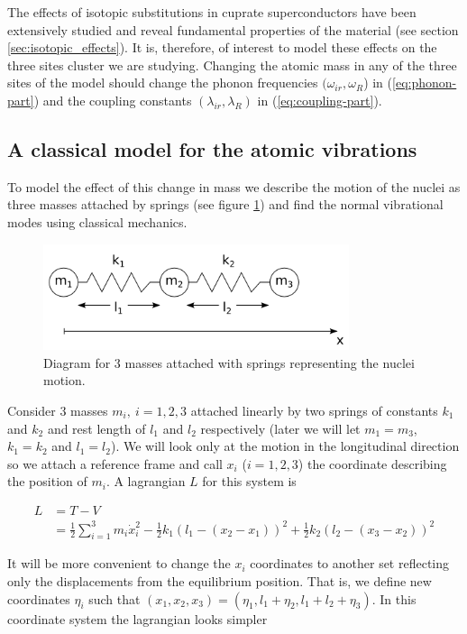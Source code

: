 The effects of isotopic substitutions in cuprate superconductors have been extensively studied and reveal fundamental properties of the material (see section \ref{sec:isotopic_effects}). 
It is, therefore, of interest to model these effects on the three sites cluster we are studying.
Changing the atomic mass in any of the three sites of the model should change the phonon frequencies $(\omega_{ir},\omega_R$) in (\ref{eq:phonon-part}) and the coupling constants $(\lambda_{ir},\lambda_R)$ in (\ref{eq:coupling-part}).

\subsection{A classical model for the atomic vibrations}

To model the effect of this change in mass we describe the motion of the nuclei as three masses attached by springs (see figure \ref{fig:3-masses-2-springs}) and find the normal vibrational modes using classical mechanics.

\begin{figure}[ht!]
\centering
\includegraphics[width=0.8\textwidth]{images/3-masses-2-springs-linear.png}
\caption{Diagram for 3 masses attached with springs representing the nuclei motion.}
\label{fig:3-masses-2-springs}
\end{figure}

Consider 3 masses $m_i,\ i=1,2,3$ attached linearly by two springs of constants $k_1$ and $k_2$ and rest length of $l_1$ and $l_2$ respectively (later we will let $ m_1=m_3$, $ k_1=k_2$ and $l_1=l_2$). 
We will look only at the motion in the longitudinal direction so we attach a reference frame and call $ x_i$ ($i=1,2,3$) the coordinate describing the position of $m_i$.
A lagrangian $L$ for this system is 

\begin{align}
L & = T-V\\
  & = \frac{1}{2}\sum_{i=1}^3 m_i \dot{x}_i^2 - \frac{1}{2}k_1(l_1-(x_2-x_1))^2+\frac{1}{2}k_2(l_2-(x_3-x_2))^2
\end{align}

It will be more convenient to change the $x_i$ coordinates to another set reflecting only the displacements from the equilibrium position.
That is, we define new coordinates $\eta_i$ such that $(x_1,x_2,x_3)=(\eta_1,l_1+\eta_2,l_1+l_2+\eta_3)$. 
In this coordinate system the lagrangian looks simpler

